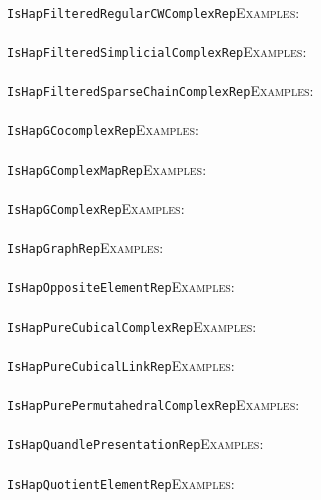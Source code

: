 \documentclass[a4paper,11pt]{report}
\begin{document}
{{ \\
 \texttt{IsHapFilteredRegularCWComplexRep}{\nobreakspace}{\nobreakspace}{\nobreakspace}{\nobreakspace}\textsc{Examples:} \\
 \\
 \texttt{IsHapFilteredSimplicialComplexRep}{\nobreakspace}{\nobreakspace}{\nobreakspace}{\nobreakspace}\textsc{Examples:} \\
 \\
 \texttt{IsHapFilteredSparseChainComplexRep}{\nobreakspace}{\nobreakspace}{\nobreakspace}{\nobreakspace}\textsc{Examples:} \\
 \\
 \texttt{IsHapGCocomplexRep}{\nobreakspace}{\nobreakspace}{\nobreakspace}{\nobreakspace}\textsc{Examples:} \\
 \\
 \texttt{IsHapGComplexMapRep}{\nobreakspace}{\nobreakspace}{\nobreakspace}{\nobreakspace}\textsc{Examples:} \\
 \\
 \texttt{IsHapGComplexRep}{\nobreakspace}{\nobreakspace}{\nobreakspace}{\nobreakspace}\textsc{Examples:} \\
 \\
 \texttt{IsHapGraphRep}{\nobreakspace}{\nobreakspace}{\nobreakspace}{\nobreakspace}\textsc{Examples:} \\
 \\
 \texttt{IsHapOppositeElementRep}{\nobreakspace}{\nobreakspace}{\nobreakspace}{\nobreakspace}\textsc{Examples:} \\
 \\
 \texttt{IsHapPureCubicalComplexRep}{\nobreakspace}{\nobreakspace}{\nobreakspace}{\nobreakspace}\textsc{Examples:} \\
 \\
 \texttt{IsHapPureCubicalLinkRep}{\nobreakspace}{\nobreakspace}{\nobreakspace}{\nobreakspace}\textsc{Examples:} \\
 \\
 \texttt{IsHapPurePermutahedralComplexRep}{\nobreakspace}{\nobreakspace}{\nobreakspace}{\nobreakspace}\textsc{Examples:} \\
 \\
 \texttt{IsHapQuandlePresentationRep}{\nobreakspace}{\nobreakspace}{\nobreakspace}{\nobreakspace}\textsc{Examples:} \\
 \\
 \texttt{IsHapQuotientElementRep}{\nobreakspace}{\nobreakspace}{\nobreakspace}{\nobreakspace}\textsc{Examples:} \\
}}
\end{document}
